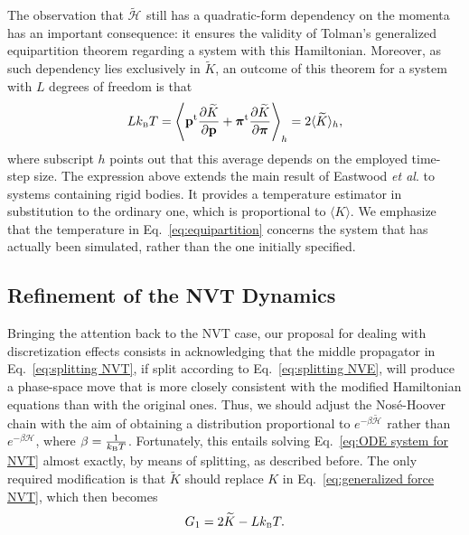 \documentclass[
	aip,
	jcp,
	reprint,
]{revtex4-1}
\newcommand{\vt}[1]{\boldsymbol{\mathbf{#1}}}          %
\newcommand{\tr}[1]{#1^\text{t}}                       %
\newcommand{\diff}[2]{\frac{\partial #1}{\partial #2}} %
\newcommand{\Ham}[1]{{\mathcal H}_\text{#1}}           %
\newcommand{\timestep}{h}
\newcommand{\refined}[1]{\widetilde{#1}}
\newcommand{\mini}[1]{\text{\tiny{#1}}}
\begin{document}
The observation that $\refined{\Ham{}}$ still has a quadratic-form dependency on the momenta has an important consequence: it ensures
the validity of Tolman's generalized equipartition theorem \cite{Tolman_1918, Uline_2008, Eastwood_2010} regarding a system with this Hamiltonian.
Moreover, as such dependency lies exclusively in $\refined K$, an outcome of this theorem for a system with $L$ degrees of freedom is that
\begin{equation}
\label{eq:equipartition}
L k_\mini{B} T = \left\langle \tr{\vt p} \diff{\refined K}{\vt p} + \tr{\vt \pi} \diff{\refined K}{\vt \pi} \right\rangle_\timestep = 2\langle \refined{K} \rangle_\timestep,
\end{equation}
where subscript $\timestep$ points out that this average depends on the employed time-step size.
The expression above extends the main result of Eastwood \textit{et al}. \cite{Eastwood_2010} to systems containing rigid bodies.
It provides a temperature estimator in substitution to the ordinary one, which is proportional to $\langle K \rangle$.
We emphasize that the temperature in Eq.~\eqref{eq:equipartition} concerns the system that has actually been simulated, rather than the one initially specified.

\subsection{Refinement of the NVT Dynamics}
\label{sec:refined_method}

Bringing the attention back to the NVT case, our proposal for dealing with discretization effects consists in acknowledging that the middle propagator in Eq.~\eqref{eq:splitting NVT}, if split according to Eq.~\eqref{eq:splitting NVE}, will produce a phase-space move that is more closely consistent with the modified Hamiltonian equations than with the original ones.
Thus, we should adjust the Nos\'e-Hoover chain with the aim of obtaining a distribution proportional to $e^{-\beta \refined{\Ham{}}}$ rather than $e^{-\beta \Ham{}}$, where $\beta = \frac{1}{k_\mini{B} T}$.
Fortunately, this entails solving Eq.~\eqref{eq:ODE system for NVT} almost exactly, by means of splitting, as described before.
The only required modification is that $\refined K$ should replace $K$ in Eq.~\eqref{eq:generalized force NVT}, which then becomes
\begin{equation}
\label{eq:thermostat_force}
G_1 = 2 \refined K - L k_\mini{B} T.
\end{equation}
\end{document}

